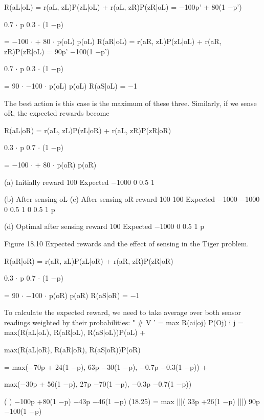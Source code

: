 R(aL|oL) = r(aL, zL)P(zL|oL) + r(aL, zR)P(zR|oL) = $-$100p' + 80(1 $-$p')

0.7 $\cdot$ p 0.3 $\cdot$ (1 $-$p)

= $-$100 $\cdot$ + 80 $\cdot$ p(oL) p(oL) R(aR|oL) = r(aR, zL)P(zL|oL) + r(aR, zR)P(zR|oL) = 90p' $-$100(1 $-$p')

0.7 $\cdot$ p 0.3 $\cdot$ (1 $-$p)

= 90 $\cdot$ $-$100 $\cdot$ p(oL) p(oL) R(aS|oL) = $-$1

The best action is this case is the maximum of these three. Similarly, if we sense oR, the expected rewards become

R(aL|oR) = r(aL, zL)P(zL|oR) + r(aL, zR)P(zR|oR)

0.3 $\cdot$ p 0.7 $\cdot$ (1 $-$p)

= $-$100 $\cdot$ + 80 $\cdot$ p(oR) p(oR)

(a) Initially reward 100 Expected $-$1000 0 0.5 1

(b) After sensing oL (c) After sensing oR reward 100 100 Expected $-$1000 $-$1000 0 0.5 1 0 0.5 1 p

(d) Optimal after sensing reward 100 Expected $-$1000 0 0.5 1 p

Figure 18.10 Expected rewards and the effect of sensing in the Tiger problem.

R(aR|oR) = r(aR, zL)P(zL|oR) + r(aR, zR)P(zR|oR)

0.3 $\cdot$ p 0.7 $\cdot$ (1 $-$p)

= 90 $\cdot$ $-$100 $\cdot$ p(oR) p(oR) R(aS|oR) = $-$1

To calculate the expected reward, we need to take average over both sensor readings weighted by their probabilities: " \# V ' = max R(ai|oj) P(Oj) i j = max(R(aL|oL), R(aR|oL), R(aS|oL))P(oL) +

max(R(aL|oR), R(aR|oR), R(aS|oR))P(oR)

= max($-$70p + 24(1 $-$p), 63p $-$30(1 $-$p), $-$0.7p $-$0.3(1 $-$p)) +

max($-$30p + 56(1 $-$p), 27p $-$70(1 $-$p), $-$0.3p $-$0.7(1 $-$p))

( ) $-$100p +80(1 $-$p) $-$43p $-$46(1 $-$p) (18.25) = max |||( 33p +26(1 $-$p) |||) 90p $-$100(1 $-$p)

